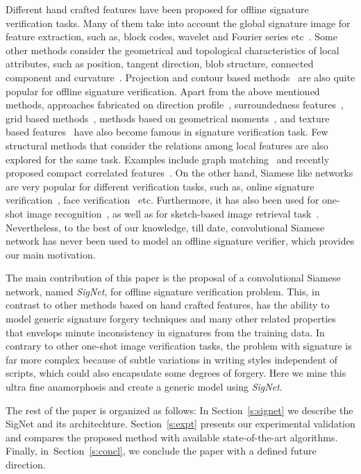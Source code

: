 \documentclass[times,twocolumn,final]{elsarticle}
\newcommand{\sect}[1]{Section~\ref{#1}}
\begin{document}
Different hand crafted features have been proposed for offline signature verification tasks. Many of them take into account the global signature image for feature extraction, such as, block codes, wavelet and Fourier series etc~\cite{Kalera2004}. Some other methods consider the geometrical and topological characteristics of local attributes, such as position, tangent direction, blob structure, connected component and curvature~\cite{Munich2003}. Projection and contour based methods~\cite{Dimauro1997} are also quite popular for offline signature verification. Apart from the above mentioned methods, approaches fabricated on direction profile~\cite{Dimauro1997,Ferrer2005}, surroundedness features~\cite{Kumar2012}, grid based methods~\cite{Huang1997a}, methods based on geometrical moments~\cite{Ramesh1999}, and texture based features~\cite{Pal2016} have also become famous in signature verification task. Few structural methods that consider the relations among local features are also explored for the same task. Examples include graph matching~\cite{Chen2006} and recently proposed compact correlated features~\cite{Dutta2016}. On the other hand, Siamese like networks are very popular for different verification tasks, such as, online signature verification~\cite{Bromley1994}, face verification~\cite{Chopra2005,Schroff2015} etc. Furthermore, it has also been used for one-shot image recognition~\cite{Koch2015}, as well as for sketch-based image retrieval task~\cite{Qi2016}. Nevertheless, to the best of our knowledge, till date, convolutional Siamese network has never been used to model an offline signature verifier, which provides our main motivation.

The main contribution of this paper is the proposal of a convolutional Siamese network, named \emph{SigNet}, for offline signature verification problem. This, in contrast to other methods based on hand crafted features, has the ability to model generic signature forgery techniques and many other related properties that envelops minute inconsistency in signatures from the training data. In contrary to other one-shot image verification tasks, the problem with signature is far more complex because of subtle variations in writing styles independent of scripts, which could also encapsulate some degrees of forgery. Here we mine this ultra fine anamorphosis and create a generic model using \emph{SigNet}.

The rest of the paper is organized as follows: In \sect{s:signet} we describe the SigNet and its architechture. \sect{s:expt} presents our experimental validation and compares the proposed method with available state-of-the-art algorithms. Finally, in~\sect{s:concl}, we conclude the paper with a defined future direction.
\end{document}
